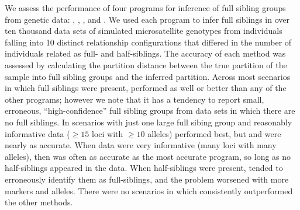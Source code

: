 

We assess the performance of four programs for inference of full sibling groups from
genetic data: \colony{} \citep{wang04,Wang2012pairwise}, \prt{} 
\citep{almudevar99}, \familyfinder{} \citep{beyer03}, and \kinalyzer{} 
\citep{bergerwolf07, sheik08}. We used each program to infer full siblings
in over ten thousand data sets of simulated microsatellite  
genotypes from individuals falling into 10 distinct relationship configurations
that differed in the number of individuals related as full- and half-siblings. 
The accuracy of
each method was assessed by calculating the partition distance between the true partition
of the sample into full sibling groups and the inferred partition. Across most
scenarios in which full siblings were present, \colony{} performed as well or better than
any of the other programs; however we note that it has a tendency to report 
small, erroneous, ``high-confidence'' full sibling groups from data sets in which there
are no full siblings. In scenarios
with just one large full sibing group and reasonably informative data ($\geq 15$ loci
with $\geq 10$ alleles) \prt{} performed best, but \colony{} and \familyfinder{} were 
nearly as accurate.  When data were very informative (many loci with many alleles), then
\familyfinder{} was often as accurate as the most accurate program, so long as no
half-siblings appeared in the data.  When half-siblings
were present, \familyfinder{} tended to erroneously identify
them as full-siblings, and the problem worsened with more markers and alleles.
There were no scenarios in which \kinalyzer{} consistently outperformed the other methods.

